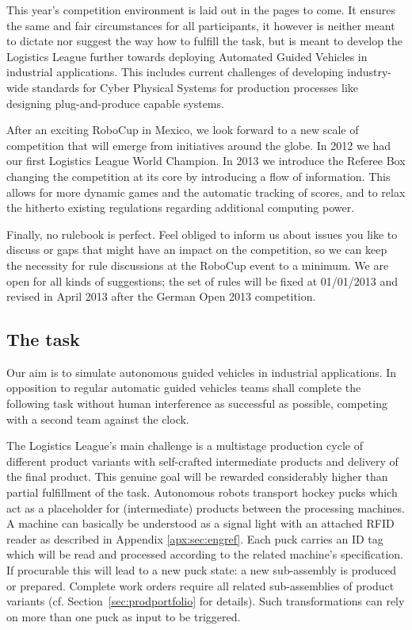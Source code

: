\documentclass[12pt,twoside]{article}
\newcommand{\refsec}[1]{Section~\ref{#1}}
\begin{document}
This year's competition environment is laid out in the pages to come.
It ensures the same and fair circumstances for all participants, it
however is neither meant to dictate nor suggest the way how to fulfill
the task, but is meant to develop the Logistics League further towards
deploying Automated Guided Vehicles in industrial applications. This
includes current challenges of developing industry-wide standards for
Cyber Physical Systems for production processes like designing
plug-and-produce capable systems.

After an exciting RoboCup in Mexico, we look forward to a new scale of
competition that will emerge from initiatives around the globe. In
2012 we had our first Logistics League World Champion.  In 2013 we
introduce the Referee Box changing the competition at its core by
introducing a flow of information.  This allows for more dynamic games
and the automatic tracking of scores, and to relax the hitherto
existing regulations regarding additional computing power.

Finally, no rulebook is perfect. Feel obliged to inform us about
issues you like to discuss or gaps that might have an impact on the
competition, so we can keep the necessity for rule discussions at the
RoboCup event to a minimum. We are open for all kinds of suggestions;
the set of rules will be fixed at 01/01/2013 and revised in April 2013
after the German Open 2013 competition.

\subsection{The task}
\label{sec:task}

Our aim is to simulate autonomous guided vehicles in industrial
applications. In opposition to regular automatic guided vehicles teams
shall complete the following task without human interference as
successful as possible, competing with a second team against the
clock.

The Logistics League's main challenge is a multistage production
cycle of different product variants with self-crafted intermediate
products and delivery of the final product. This genuine goal will be
rewarded considerably higher than partial fulfillment of the task.
Autonomous robots transport hockey pucks which act as a placeholder
for (intermediate) products between the processing machines. A machine
can basically be understood as a signal light with an attached RFID
reader as described in Appendix \ref{apx:sec:engref}. Each puck
carries an ID tag which will be read and processed according to the
related machine's specification. If procurable this will lead to a new
puck state: a new sub-assembly is produced or prepared. Complete
work orders require all related sub-assemblies of product variants (cf.
\refsec{sec:prodportfolio} for details). Such transformations can rely
on more than one puck as input to be triggered.
\end{document}
